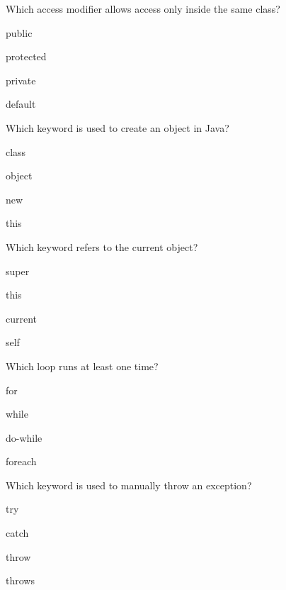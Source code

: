 \documentclass{USTBExam}
\begin{document}
\begin{question}
Which access modifier allows access only inside the same class?
\paren
\begin{choices}
\item public
\item protected
\item private
\item default
\end{choices}
\end{question}

\begin{question}
Which keyword is used to create an object in Java?
\paren
\begin{choices}
\item class
\item object
\item new
\item this
\end{choices}
\end{question}

\begin{question}
Which keyword refers to the current object?
\paren
\begin{choices}
\item super
\item this
\item current
\item self
\end{choices}
\end{question}

\begin{question}
Which loop runs at least one time?
\paren
\begin{choices}
\item for
\item while
\item do-while
\item foreach
\end{choices}
\end{question}

\begin{question}
Which keyword is used to manually throw an exception?
\paren
\begin{choices}
\item try
\item catch
\item throw
\item throws
\end{choices}
\end{question}
\end{document}
